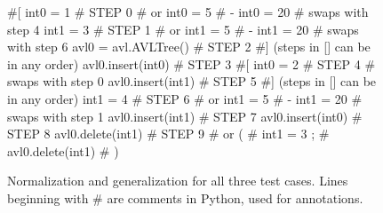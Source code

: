 \begin{figure}[t]
{\scriptsize
\begin{code}
\textcolor{black!60}{\#[}
int0 = 1                              \textcolor{black!60}{\# STEP 0}
\textcolor{black!60}{\#  or int0 = 5 }
\textcolor{black!60}{\#   - int0 = 20} 
\textcolor{black!60}{\#  swaps with step 4}
int1 = 3                              \textcolor{black!60}{\# STEP 1}
\textcolor{black!60}{\#  or int1 = 5 }
\textcolor{black!60}{\#   - int1 = 20} 
\textcolor{black!60}{\#  swaps with step 6}
avl0 = avl.AVLTree()                  \textcolor{black!60}{\# STEP 2}
\textcolor{black!60}{\#] (steps in [] can be in any order)}
avl0.insert(int0)                     \textcolor{black!60}{\# STEP 3}
\textcolor{black!60}{\#[}
int0 = 2                              \textcolor{black!60}{\# STEP 4}
\textcolor{black!60}{\#  swaps with step 0}
avl0.insert(int1)                     \textcolor{black!60}{\# STEP 5}
\textcolor{black!60}{\#] (steps in [] can be in any order)}
int1 = 4                              \textcolor{black!60}{\# STEP 6}
\textcolor{black!60}{\#  or int1 = 5 }
\textcolor{black!60}{\#   - int1 = 20} 
\textcolor{black!60}{\#  swaps with step 1}
avl0.insert(int1)                     \textcolor{black!60}{\# STEP 7}
avl0.insert(int0)                     \textcolor{black!60}{\# STEP 8}
avl0.delete(int1)                     \textcolor{black!60}{\# STEP 9}
\textcolor{black!60}{\#  or (}
\textcolor{black!60}{\#      int1 = 3  ;}
\textcolor{black!60}{\#      avl0.delete(int1) }
\textcolor{black!60}{\#     )}
\end{code}
}
\caption{\scriptsize{Normalization and generalization for all three test cases.
  Lines beginning with \# are comments in Python, used for annotations.}}
\label{normalgen}
\end{figure}

